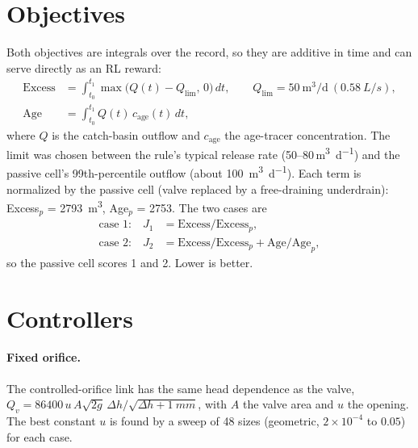 \documentclass[11pt]{article}
\begin{document}
\section{Objectives}\label{sec:obj}
Both objectives are integrals over the record, so they are additive in time and can serve
directly as an RL reward:
\begin{align}
\mathrm{Excess} &= \int_{t_0}^{t_1} \max\!\big(Q(t) - Q_{\lim},\,0\big)\,dt,
  \qquad Q_{\lim} = \SI{50}{\m^3\per\day}\ (\SI{0.58}{L/s}),\\
\mathrm{Age} &= \int_{t_0}^{t_1} Q(t)\,c_{\mathrm{age}}(t)\,dt,
\end{align}
where $Q$ is the catch-basin outflow and $c_{\mathrm{age}}$ the age-tracer concentration. The
limit was chosen between the rule's typical release rate (50--80\,\si{\m^3\per\day}) and the
passive cell's 99th-percentile outflow (about \SI{100}{\m^3\per\day}). Each term is normalized
by the passive cell (valve replaced by a free-draining underdrain): Excess$_p$ =
\SI{2793}{\m^3}, Age$_p$ = 2753. The two cases are
\begin{align}
\text{case 1:}\quad J_1 &= \mathrm{Excess}/\mathrm{Excess}_p, \\
\text{case 2:}\quad J_2 &= \mathrm{Excess}/\mathrm{Excess}_p + \mathrm{Age}/\mathrm{Age}_p,
\end{align}
so the passive cell scores 1 and 2. Lower is better.

\section{Controllers}
\paragraph{Fixed orifice.} The controlled-orifice link has the same head dependence as the
valve, $Q_v = 86400\,u\,A\sqrt{2g}\,\Delta h/\sqrt{\Delta h + \SI{1}{mm}}$, with $A$ the
valve area and $u$ the opening. The best constant $u$ is found by a sweep of 48 sizes
(geometric, $2\times10^{-4}$ to $0.05$) for each case.
\end{document}
